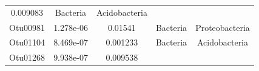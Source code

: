 \documentclass[]{article}
\begin{document}
\begin{longtable}[]{@{}ccccc@{}}
\begin{minipage}[t]{0.13\columnwidth}
0.009083\strut
\end{minipage} & \begin{minipage}[t]{0.13\columnwidth}\centering\strut
Bacteria\strut
\end{minipage} & \begin{minipage}[t]{0.27\columnwidth}\centering\strut
Acidobacteria\strut
\end{minipage}\tabularnewline
\begin{minipage}[t]{0.13\columnwidth}\centering\strut
Otu00981\strut
\end{minipage} & \begin{minipage}[t]{0.14\columnwidth}\centering\strut
1.278e-06\strut
\end{minipage} & \begin{minipage}[t]{0.13\columnwidth}\centering\strut
0.01541\strut
\end{minipage} & \begin{minipage}[t]{0.13\columnwidth}\centering\strut
Bacteria\strut
\end{minipage} & \begin{minipage}[t]{0.27\columnwidth}\centering\strut
Proteobacteria\strut
\end{minipage}\tabularnewline
\begin{minipage}[t]{0.13\columnwidth}\centering\strut
Otu01104\strut
\end{minipage} & \begin{minipage}[t]{0.14\columnwidth}\centering\strut
8.469e-07\strut
\end{minipage} & \begin{minipage}[t]{0.13\columnwidth}\centering\strut
0.001233\strut
\end{minipage} & \begin{minipage}[t]{0.13\columnwidth}\centering\strut
Bacteria\strut
\end{minipage} & \begin{minipage}[t]{0.27\columnwidth}\centering\strut
Acidobacteria\strut
\end{minipage}\tabularnewline
\begin{minipage}[t]{0.13\columnwidth}\centering\strut
Otu01268\strut
\end{minipage} & \begin{minipage}[t]{0.14\columnwidth}\centering\strut
9.938e-07\strut
\end{minipage} & \begin{minipage}[t]{0.13\columnwidth}\centering\strut
0.009538\strut
\end{minipage} & \begin{minipage}[t]{0.13\columnwidth}\centering\strut

\end{minipage}
\end{longtable}
\end{document}
